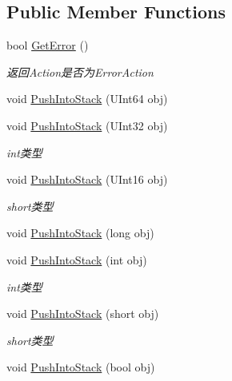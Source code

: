 \subsection*{Public Member Functions}
\begin{DoxyCompactItemize}
\item 
bool \mbox{\hyperlink{class_t_net_1_1_service_1_1_game_struct_ad91c83aa507d6d20fb3bd2898a2f68aa}{Get\+Error}} ()
\begin{DoxyCompactList}\small\item\em 返回\+Action是否为\+Error\+Action \end{DoxyCompactList}\item 
void \mbox{\hyperlink{class_t_net_1_1_service_1_1_game_struct_a83715afc3269830a26d70a4c3adb0d31}{Push\+Into\+Stack}} (U\+Int64 obj)
\item 
void \mbox{\hyperlink{class_t_net_1_1_service_1_1_game_struct_a051fea5af359b61ae3fb706ae8f26415}{Push\+Into\+Stack}} (U\+Int32 obj)
\begin{DoxyCompactList}\small\item\em int类型 \end{DoxyCompactList}\item 
void \mbox{\hyperlink{class_t_net_1_1_service_1_1_game_struct_a64401322dcb157ddebf7fb755f0b73df}{Push\+Into\+Stack}} (U\+Int16 obj)
\begin{DoxyCompactList}\small\item\em short类型 \end{DoxyCompactList}\item 
void \mbox{\hyperlink{class_t_net_1_1_service_1_1_game_struct_a9df4b16818a61880a811335b2a5b3bd7}{Push\+Into\+Stack}} (long obj)
\item 
void \mbox{\hyperlink{class_t_net_1_1_service_1_1_game_struct_a8981266f39fc2a1c1ee95ddebe52b281}{Push\+Into\+Stack}} (int obj)
\begin{DoxyCompactList}\small\item\em int类型 \end{DoxyCompactList}\item 
void \mbox{\hyperlink{class_t_net_1_1_service_1_1_game_struct_a517c9733e0959bd604b32e403eb7b6af}{Push\+Into\+Stack}} (short obj)
\begin{DoxyCompactList}\small\item\em short类型 \end{DoxyCompactList}\item 
void \mbox{\hyperlink{class_t_net_1_1_service_1_1_game_struct_a217854506e840131a4391605fd9e2909}{Push\+Into\+Stack}} (bool obj)

\end{DoxyCompactItemize}
